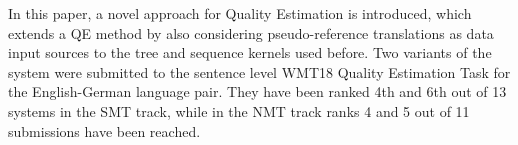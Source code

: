 In this paper, a novel approach for Quality Estimation is introduced, which extends a QE method by also considering pseudo-reference translations as data input sources to the tree and sequence kernels used before. Two variants of the system were submitted to the sentence level WMT18 Quality Estimation Task for the English-German language pair. They have been ranked 4th and 6th out of 13 systems in the SMT track, while in the NMT track ranks 4 and 5 out of 11 submissions have been reached.
